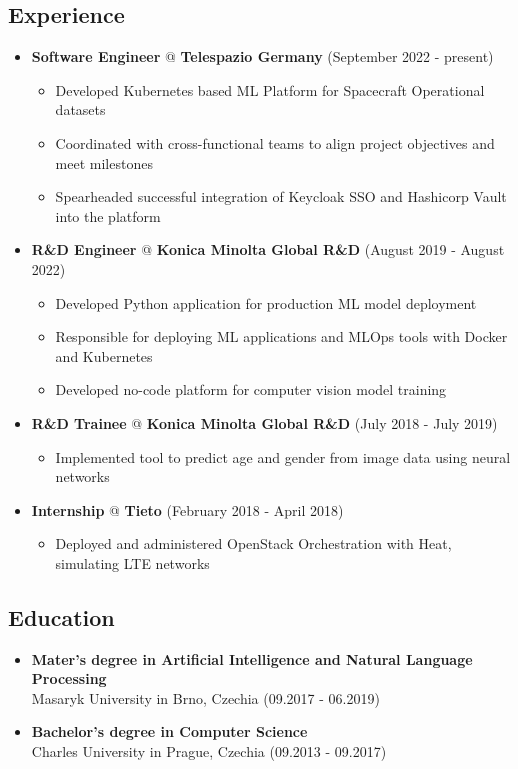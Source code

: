 \documentclass[a4paper,12pt]{article}
\begin{document}
{\color{myblue}
\subsection*{Experience}\label{work}
}
\begin{itemize}
\item
  \textbf{Software Engineer} @ \textbf{Telespazio Germany} \hfill (September 2022 - present)
  \begin{itemize}
      \item Developed Kubernetes based ML Platform for Spacecraft Operational datasets
      \item Coordinated with cross-functional teams to align project objectives and meet milestones
      \item Spearheaded successful integration of Keycloak SSO and Hashicorp Vault into the platform
  \end{itemize}
\item
  \textbf{R\&D Engineer} @ \textbf{Konica Minolta Global R\&D} \hfill (August 2019 - August 2022)
  \begin{itemize}
      \item Developed Python application for production ML model deployment
      \item Responsible for deploying ML applications and MLOps tools with Docker and Kubernetes
      \item Developed no-code platform for computer vision model training
  \end{itemize}
\item
  \textbf{R\&D Trainee} @ \textbf{Konica Minolta Global R\&D} \hfill (July 2018 - July 2019)
  \begin{itemize}
      \item Implemented tool to predict age and gender from image data using neural networks
  \end{itemize}
\item
  \textbf{Internship} @ \textbf{Tieto} \hfill (February 2018 - April 2018)
  \begin{itemize}
      \item Deployed and administered OpenStack Orchestration with Heat, simulating LTE networks
  \end{itemize}
\end{itemize}

{\color{myblue}
\subsection*{Education}\label{education}
}
\begin{itemize}
\item
  \textbf{Mater's degree in Artificial Intelligence and Natural Language Processing}\\
  Masaryk University in Brno, Czechia \hfill (09.2017 - 06.2019)
\item
  \textbf{Bachelor's degree in Computer Science}\\
  Charles University in Prague, Czechia \hfill (09.2013 - 09.2017)
\end{itemize}
\end{document}
